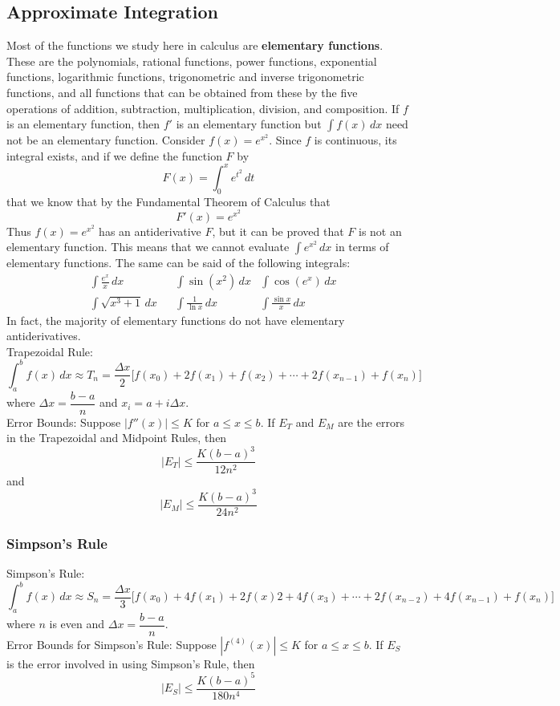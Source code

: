 \subsection{Approximate Integration}

Most of the functions we study here in calculus are
\textbf{elementary functions}.
These are the polynomials, rational functions, power functions, exponential
functions, logarithmic functions, trigonometric and inverse trigonometric
functions, and all functions that can be obtained from these by the five
operations of addition, subtraction, multiplication, division, and
composition.
If \(f\) is an elementary function, then \(f'\) is an elementary function but
\(\displaystyle{\int f(x)\,dx}\) need not be an elementary function.
Consider \(f(x)=e^{x^2}\).
Since \(f\) is continuous, its integral exists, and if we define the function
\(F\) by
\[F(x)=\int_0^x e^{t^2}\,dt\]
that we know that by the Fundamental Theorem of Calculus that
\[F'(x)=e^{x^2}\]
Thus \(f(x)=e^{x^2}\) has an antiderivative \(F\), but it can be proved that
\(F\) is not an elementary function.
This means that we cannot evaluate \(\displaystyle{\int e^{x^2}\,dx}\) in
terms of elementary functions.
The same can be said of the following integrals:
\begin{align*}
    & \int\frac{e^x}{x}\,dx && \int\sin(x^2)\,dx & \int\cos(e^x)\,dx \\
    & \int\sqrt{x^3+1}\,dx && \int\frac{1}{\ln x}\,dx & \int\frac{\sin x}{x}\,dx
\end{align*}
In fact, the majority of elementary functions do not have elementary
antiderivatives. \\
Trapezoidal Rule:
\[\int_a^b f(x)\,dx\approx T_n
=\frac{\Delta x}{2}\big[f(x_0)+2f(x_1)+f(x_2)+\cdots+2f(x_{n-1})+f(x_n)\big]\]
where \(\Delta x=\dfrac{b-a}{n}\) and \(x_i=a+i\Delta x\). \\
Error Bounds: Suppose \(|f''(x)|\leq K\) for \(a\leq x\leq b\).
If \(E_T\) and \(E_M\) are the errors in the Trapezoidal and Midpoint Rules,
then
\[|E_T|\leq\frac{K(b-a)^3}{12n^2}\]
and
\[|E_M|\leq\frac{K(b-a)^3}{24n^2}\]

\subsubsection*{Simpson's Rule}
Simpson's Rule:
\[\int_a^b f(x)\,dx\approx S_n
=\frac{\Delta x}{3}\big[f(x_0)+4f(x_1)+2f(x)2+4f(x_3)+\cdots+2f(x_{n-2})
+4f(x_{n-1})+f(x_n)\big]\]
where \(n\) is even and \(\Delta x=\dfrac{b-a}{n}\). \\
Error Bounds for Simpson's Rule: Suppose \(|f^{(4)}(x)|\leq K\) for
\(a\leq x\leq b\).
If \(E_S\) is the error involved in using Simpson's Rule, then
\[|E_S|\leq\frac{K(b-a)^5}{180n^4}\]